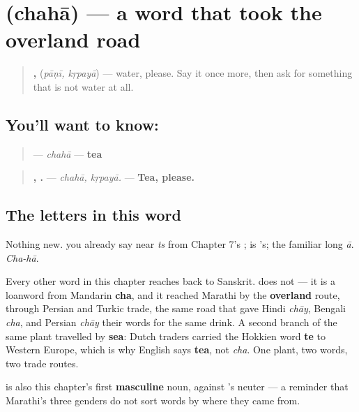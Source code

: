 \section[chahā]{ (chahā) — a word that took the overland road}

\label{lesson:MR-C10-chaha}



\begin{quote}
\textbf{, } (\emph{pāṇī, kṛpayā}) — water, please. Say it once more, then ask for something that is not water at all.
\end{quote}

\subsection*{You'll want to know: }
\begin{quote}
\textbf{} — \emph{chahā} — \textbf{tea}
\end{quote}

\begin{quote}
\textbf{, .} — \emph{chahā, kṛpayā.} — \textbf{Tea, please.}
\end{quote}

\subsection*{The letters in this word}
Nothing new. \textbf{} you already say near \emph{ts} from Chapter 7's \textbf{}; \textbf{} is \textbf{}'s; \textbf{} the familiar long \emph{ā}. \emph{Cha-hā}.

\begin{cousinweb}
Every other word in this chapter reaches back to Sanskrit. \textbf{} does not — it is a loanword from Mandarin \textbf{cha}, and it reached Marathi by the \textbf{overland} route, through Persian and Turkic trade, the same road that gave Hindi \textbf{} \emph{chāy}, Bengali \emph{cha}, and Persian \emph{chāy} their words for the same drink. A second branch of the same plant travelled by \textbf{sea}: Dutch traders carried the Hokkien word \textbf{te} to Western Europe, which is why English says \textbf{tea}, not \emph{cha}. One plant, two words, two trade routes.

\textbf{} is also this chapter's first \textbf{masculine} noun, against \textbf{}'s neuter — a reminder that Marathi's three genders do not sort words by where they came from.
\end{cousinweb}

